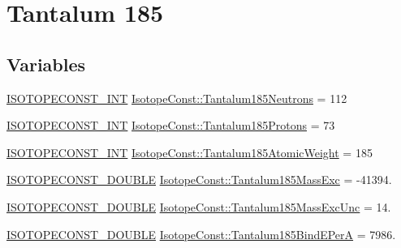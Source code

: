 \hypertarget{group___isotope_const-_tantalum-_ta185}{}\section{Tantalum 185}
\label{group___isotope_const-_tantalum-_ta185}
\subsection*{Variables}
\begin{DoxyCompactItemize}
\item 
\mbox{\hyperlink{group___isotope_const-_macros_ga5f18360b3e99483a35c32d789e62621c}{I\+S\+O\+T\+O\+P\+E\+C\+O\+N\+S\+T\+\_\+\+I\+NT}} \mbox{\hyperlink{group___isotope_const-_tantalum-_ta185_gac3d8213c2361ecfe694f21d858fb4d90}{Isotope\+Const\+::\+Tantalum185\+Neutrons}} = 112
\item 
\mbox{\hyperlink{group___isotope_const-_macros_ga5f18360b3e99483a35c32d789e62621c}{I\+S\+O\+T\+O\+P\+E\+C\+O\+N\+S\+T\+\_\+\+I\+NT}} \mbox{\hyperlink{group___isotope_const-_tantalum-_ta185_gaee994f66cfeebbd094aedbfdec598ff9}{Isotope\+Const\+::\+Tantalum185\+Protons}} = 73
\item 
\mbox{\hyperlink{group___isotope_const-_macros_ga5f18360b3e99483a35c32d789e62621c}{I\+S\+O\+T\+O\+P\+E\+C\+O\+N\+S\+T\+\_\+\+I\+NT}} \mbox{\hyperlink{group___isotope_const-_tantalum-_ta185_ga0c2746dc8a3db71ebef5790a800468ca}{Isotope\+Const\+::\+Tantalum185\+Atomic\+Weight}} = 185
\item 
\mbox{\hyperlink{group___isotope_const-_macros_ga8f45a7272ce02c0b4c65c44636ed719a}{I\+S\+O\+T\+O\+P\+E\+C\+O\+N\+S\+T\+\_\+\+D\+O\+U\+B\+LE}} \mbox{\hyperlink{group___isotope_const-_tantalum-_ta185_ga1337216e57ffd22a7817e6745d81c173}{Isotope\+Const\+::\+Tantalum185\+Mass\+Exc}} = -\/41394.
\item 
\mbox{\hyperlink{group___isotope_const-_macros_ga8f45a7272ce02c0b4c65c44636ed719a}{I\+S\+O\+T\+O\+P\+E\+C\+O\+N\+S\+T\+\_\+\+D\+O\+U\+B\+LE}} \mbox{\hyperlink{group___isotope_const-_tantalum-_ta185_gad09625c20de3e281a7e0c7ee24ed44ca}{Isotope\+Const\+::\+Tantalum185\+Mass\+Exc\+Unc}} = 14.
\item 
\mbox{\hyperlink{group___isotope_const-_macros_ga8f45a7272ce02c0b4c65c44636ed719a}{I\+S\+O\+T\+O\+P\+E\+C\+O\+N\+S\+T\+\_\+\+D\+O\+U\+B\+LE}} \mbox{\hyperlink{group___isotope_const-_tantalum-_ta185_gaac25538b85365b9fe39a194f5437e310}{Isotope\+Const\+::\+Tantalum185\+Bind\+E\+PerA}} = 7986.
\item 

\end{DoxyCompactItemize}
